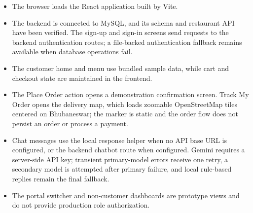 \begin{itemize}
\item The browser loads the React application built by Vite.
\item The backend is connected to MySQL, and its schema and restaurant API have been verified. The sign-up and sign-in screens send requests to the backend authentication routes; a file-backed authentication fallback remains available when database operations fail.
\item The customer home and menu use bundled sample data, while cart and checkout state are maintained in the frontend.
\item The Place Order action opens a demonstration confirmation screen. Track My Order opens the delivery map, which loads zoomable OpenStreetMap tiles centered on Bhubaneswar; the marker is static and the order flow does not persist an order or process a payment.
\item Chat messages use the local response helper when no API base URL is configured, or the backend chatbot route when configured. Gemini requires a server-side API key; transient primary-model errors receive one retry, a secondary model is attempted after primary failure, and local rule-based replies remain the final fallback.
\item The portal switcher and non-customer dashboards are prototype views and do not provide production role authorization.
\end{itemize}
